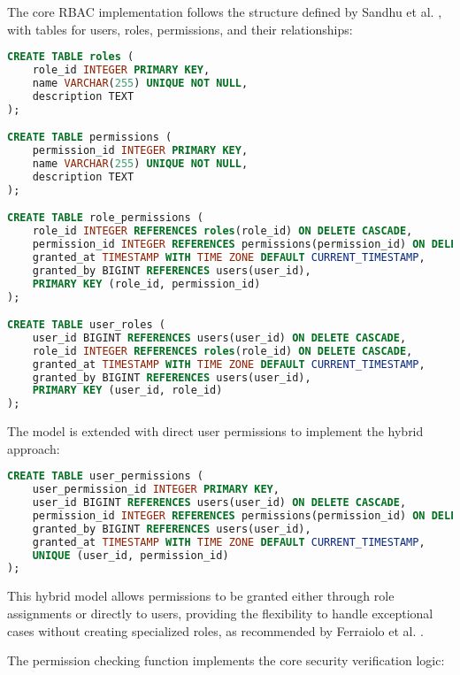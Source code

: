 The core RBAC implementation follows the structure defined by Sandhu et al. \cite{sandhu1998role}, with tables for users, roles, permissions, and their relationships:

\begin{lstlisting}[language=SQL, caption={Core RBAC Implementation}, label={lst:rbac-implementation}]
CREATE TABLE roles (
    role_id INTEGER PRIMARY KEY,
    name VARCHAR(255) UNIQUE NOT NULL,
    description TEXT
);

CREATE TABLE permissions (
    permission_id INTEGER PRIMARY KEY,
    name VARCHAR(255) UNIQUE NOT NULL,
    description TEXT
);

CREATE TABLE role_permissions (
    role_id INTEGER REFERENCES roles(role_id) ON DELETE CASCADE,
    permission_id INTEGER REFERENCES permissions(permission_id) ON DELETE CASCADE,
    granted_at TIMESTAMP WITH TIME ZONE DEFAULT CURRENT_TIMESTAMP,
    granted_by BIGINT REFERENCES users(user_id),
    PRIMARY KEY (role_id, permission_id)
);

CREATE TABLE user_roles (
    user_id BIGINT REFERENCES users(user_id) ON DELETE CASCADE,
    role_id INTEGER REFERENCES roles(role_id) ON DELETE CASCADE,
    granted_at TIMESTAMP WITH TIME ZONE DEFAULT CURRENT_TIMESTAMP,
    granted_by BIGINT REFERENCES users(user_id),
    PRIMARY KEY (user_id, role_id)
);
\end{lstlisting}

The model is extended with direct user permissions to implement the hybrid approach:

\begin{lstlisting}[language=SQL, caption={User-Permission Implementation}, label={lst:user-permission}]
CREATE TABLE user_permissions (
    user_permission_id INTEGER PRIMARY KEY,
    user_id BIGINT REFERENCES users(user_id) ON DELETE CASCADE,
    permission_id INTEGER REFERENCES permissions(permission_id) ON DELETE CASCADE,
    granted_by BIGINT REFERENCES users(user_id),
    granted_at TIMESTAMP WITH TIME ZONE DEFAULT CURRENT_TIMESTAMP,
    UNIQUE (user_id, permission_id)
);
\end{lstlisting}

This hybrid model allows permissions to be granted either through role assignments or directly to users, providing the flexibility to handle exceptional cases without creating specialized roles, as recommended by Ferraiolo et al. \cite{ferraiolo2011policy}.

The permission checking function implements the core security verification logic:

